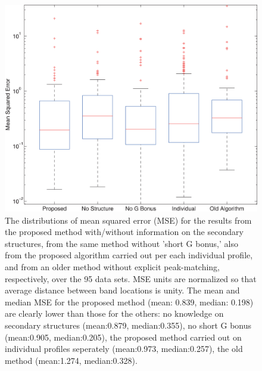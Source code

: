 \documentclass[letter]{bioinfo}
\begin{document}
\begin{figure}
\centering
\includegraphics[width=0.95\linewidth]{figures/supp_old_new_comparison3}
\caption{The distributions of mean squared error (MSE) for the results from the proposed method with/without information on the secondary structures, from the same method without 'short G bonus,' also from the proposed algorithm carried out per each individual profile, and from an older method without explicit peak-matching, respectively, over the 95 data sets. MSE units are normalized so that average distance between band locations is unity. The mean and median MSE for the proposed method (mean: 0.839, median: 0.198) are clearly lower than those for the others: no knowledge on secondary structures (mean:0.879, median:0.355), no short G bonus (mean:0.905, median:0.205), the proposed method carried out on individual profiles seperately (mean:0.973, median:0.257), the old method (mean:1.274, median:0.328).  }
\label{f:old_vs_new}
\end{figure}
\end{document}
